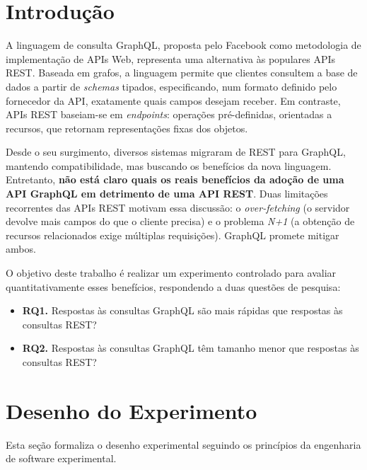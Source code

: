 \documentclass[conference]{IEEEtran}
\begin{document}
\section{Introdução}
A linguagem de consulta GraphQL, proposta pelo Facebook como metodologia de
implementação de APIs Web, representa uma alternativa às populares APIs REST.
Baseada em grafos, a linguagem permite que clientes consultem a base de dados a
partir de \textit{schemas} tipados, especificando, num formato definido pelo
fornecedor da API, exatamente quais campos desejam receber. Em contraste, APIs
REST baseiam-se em \textit{endpoints}: operações pré-definidas, orientadas a
recursos, que retornam representações fixas dos objetos.

Desde o seu surgimento, diversos sistemas migraram de REST para GraphQL,
mantendo compatibilidade, mas buscando os benefícios da nova linguagem.
Entretanto, \textbf{não está claro quais os reais benefícios da adoção de uma
API GraphQL em detrimento de uma API REST}. Duas limitações recorrentes das
APIs REST motivam essa discussão: o \textit{over-fetching} (o servidor devolve
mais campos do que o cliente precisa) e o problema \textit{N+1} (a obtenção de
recursos relacionados exige múltiplas requisições). GraphQL promete mitigar
ambos.

O objetivo deste trabalho é realizar um experimento controlado para avaliar
quantitativamente esses benefícios, respondendo a duas questões de pesquisa:

\begin{itemize}
  \item \textbf{RQ1.} Respostas às consultas GraphQL são mais rápidas que
  respostas às consultas REST?
  \item \textbf{RQ2.} Respostas às consultas GraphQL têm tamanho menor que
  respostas às consultas REST?
\end{itemize}

\section{Desenho do Experimento}
Esta seção formaliza o desenho experimental seguindo os princípios da
engenharia de software experimental.
\end{document}
